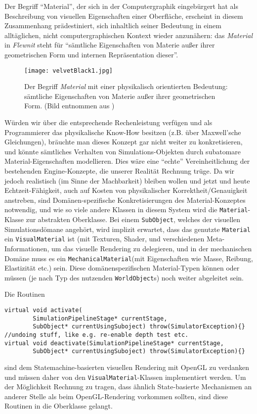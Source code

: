 	Der Begriff "`Material"', der sich in der Computergraphik eingebürgert hat als Beschreibung von visuellen Eigenschaften
	einer Oberfläche, erscheint in diesem Zusammenhang prädestiniert, sich inhaltlich seiner Bedeutung 
	in einem alltäglichen, nicht computergraphischen Kontext wieder anzunähern:
	das \emph{Material} in \emph{Flewnit} steht für "`sämtliche Eigenschaften von Materie 
	außer ihrer geometrischen Form und internen Repräsentation dieser"'.

	\begin{figure}[!h]
		\centering
	   	\texttt{[image: velvetBlack1.jpg]}
		\caption{ Der Begriff \emph{Material} mit einer physikalisch orientierten Bedeutung:
			sämtliche Eigenschaften von Materie	außer ihrer geometrischen Form.
			(Bild entnommen aus \cite{microfacet})
		}
		\label{fig:material}
	\end{figure}
	
	Würden wir über die entsprechende Rechenleistung verfügen und als Programmierer das physikalische Know-How
	besitzen (z.B. über Maxwell'sche Gleichungen), bräuchte man dieses Konzept gar nicht weiter zu konkretisieren,
	und könnte sämtliches Verhalten von Simulations-Objekten durch subatomare Material-Eigenschaften modellieren.
	Dies wäre eine "`echte"' Vereinheitlichung der bestehenden Engine-Konzepte, die unserer Realität Rechnung trüge.
	Da wir jedoch realistisch (im Sinne der Machbarkeit) bleiben wollen und jetzt und heute Echtzeit-Fähigkeit,
	auch auf Kosten von physikalischer Korrektheit/Genauigkeit anstreben, sind Domänen-spezifische Konkretisierungen des
	Material-Konzeptes notwendig, und wie so viele andere Klassen in diesem System wird die 
	\lstinline|Material|-Klasse zur abstrakten Oberklasse.
	Bei einem \lstinline|SubObject|, welches der visuellen Simulationsdömane angehört, wird implizit erwartet,
	dass das genutzte \lstinline|Material| ein \lstinline|VisualMaterial| ist 
	(mit Texturen, Shader, und verschiedenen Meta-Informationen, um das visuelle Rendering zu delegieren, 
	und in der mechanischen Domäne muss es ein \lstinline|MechanicalMaterial|(mit Eigenschaften wie Masse, Reibung, 	
	Elastizität etc.) sein. Diese domänenspezifischen Material-Typen können oder müssen (je nach Typ des nutzenden
	\lstinline|WorldObject|s) noch weiter abgeleitet sein.
	
	Die Routinen
	\begin{lstlisting}
virtual void activate(
		SimulationPipelineStage* currentStage,
		SubObject* currentUsingSuboject) throw(SimulatorException){}
//undoing stuff, like e.g. re-enable depth test etc.
virtual void deactivate(SimulationPipelineStage* currentStage,
		SubObject* currentUsingSuboject) throw(SimulatorException){}
	\end{lstlisting}
	sind dem Statemachine-basierten visuellen Rendering mit OpenGL zu verdanken und müssen daher von den
	\lstinline|VisualMaterial|-Klassen implementiert werden. Um der Möglichkeit Rechnung zu tragen, dass
	ähnlich State-basierte Mechanismen an anderer Stelle als beim OpenGL-Rendering vorkommen sollten, sind diese
	Routinen in die Oberklasse gelangt.

